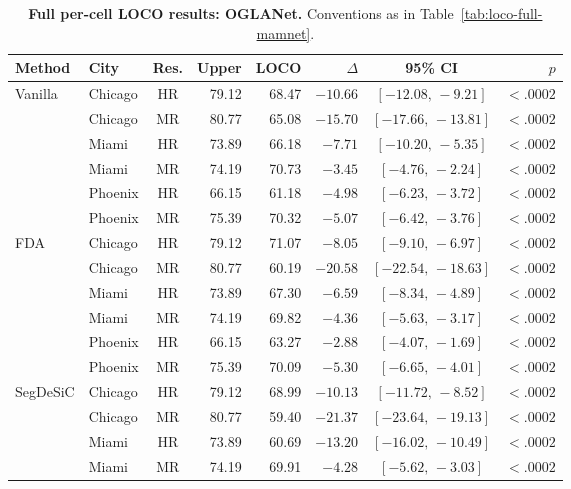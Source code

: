 \begin{table}[h]
\centering
\footnotesize
\setlength{\tabcolsep}{4pt}
\caption{
\textbf{Full per-cell LOCO results: OGLANet.}
Conventions as in Table~\ref{tab:loco-full-mamnet}.
}
\label{tab:loco-full-oglanet}
\begin{tabular}{@{}llcrrrcr@{}}
\toprule
\textbf{Method} & \textbf{City} & \textbf{Res.} & \textbf{Upper} & \textbf{LOCO} & $\Delta$ & \textbf{95\% CI} & $p$ \\
\midrule
Vanilla   & Chicago & HR & 79.12 & 68.47 & $-10.66$ & $[-12.08,\,-9.21]$  & $<\!.0002$ \\
          & Chicago & MR & 80.77 & 65.08 & $-15.70$ & $[-17.66,\,-13.81]$ & $<\!.0002$ \\
          & Miami   & HR & 73.89 & 66.18 & $-7.71$  & $[-10.20,\,-5.35]$  & $<\!.0002$ \\
          & Miami   & MR & 74.19 & 70.73 & $-3.45$  & $[-4.76,\,-2.24]$   & $<\!.0002$ \\
          & Phoenix & HR & 66.15 & 61.18 & $-4.98$  & $[-6.23,\,-3.72]$   & $<\!.0002$ \\
          & Phoenix & MR & 75.39 & 70.32 & $-5.07$  & $[-6.42,\,-3.76]$   & $<\!.0002$ \\
\cmidrule(l){1-8}
FDA       & Chicago & HR & 79.12 & 71.07 & $-8.05$  & $[-9.10,\,-6.97]$   & $<\!.0002$ \\
          & Chicago & MR & 80.77 & 60.19 & $-20.58$ & $[-22.54,\,-18.63]$ & $<\!.0002$ \\
          & Miami   & HR & 73.89 & 67.30 & $-6.59$  & $[-8.34,\,-4.89]$   & $<\!.0002$ \\
          & Miami   & MR & 74.19 & 69.82 & $-4.36$  & $[-5.63,\,-3.17]$   & $<\!.0002$ \\
          & Phoenix & HR & 66.15 & 63.27 & $-2.88$  & $[-4.07,\,-1.69]$   & $<\!.0002$ \\
          & Phoenix & MR & 75.39 & 70.09 & $-5.30$  & $[-6.65,\,-4.01]$   & $<\!.0002$ \\
\cmidrule(l){1-8}
SegDeSiC  & Chicago & HR & 79.12 & 68.99 & $-10.13$ & $[-11.72,\,-8.52]$  & $<\!.0002$ \\
          & Chicago & MR & 80.77 & 59.40 & $-21.37$ & $[-23.64,\,-19.13]$ & $<\!.0002$ \\
          & Miami   & HR & 73.89 & 60.69 & $-13.20$ & $[-16.02,\,-10.49]$ & $<\!.0002$ \\
          & Miami   & MR & 74.19 & 69.91 & $-4.28$  & $[-5.62,\,-3.03]$   & $<\!.0002$ \\

\end{tabular}
\end{table}
